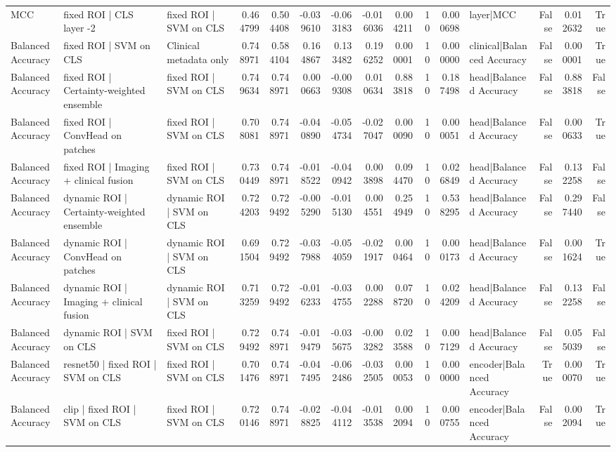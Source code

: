 \begin{table}
\begin{tabular}{lllrrrrrrrrlrrr}
MCC & fixed ROI | CLS layer -2 & fixed ROI | SVM on CLS & 0.464799 & 0.504408 & -0.039610 & -0.063183 & -0.016036 & 0.004211 & 10 & 0.000698 & layer|MCC & False & 0.012632 & True \\
Balanced Accuracy & fixed ROI | SVM on CLS & Clinical metadata only & 0.748971 & 0.584104 & 0.164867 & 0.133482 & 0.196252 & 0.000001 & 10 & 0.000000 & clinical|Balanced Accuracy & False & 0.000001 & True \\
Balanced Accuracy & fixed ROI | Certainty-weighted ensemble & fixed ROI | SVM on CLS & 0.749634 & 0.748971 & 0.000663 & -0.009308 & 0.010634 & 0.883818 & 10 & 0.187498 & head|Balanced Accuracy & False & 0.883818 & False \\
Balanced Accuracy & fixed ROI | ConvHead on patches & fixed ROI | SVM on CLS & 0.708081 & 0.748971 & -0.040890 & -0.054734 & -0.027047 & 0.000090 & 10 & 0.000051 & head|Balanced Accuracy & False & 0.000633 & True \\
Balanced Accuracy & fixed ROI | Imaging + clinical fusion & fixed ROI | SVM on CLS & 0.730449 & 0.748971 & -0.018522 & -0.040942 & 0.003898 & 0.094470 & 10 & 0.026849 & head|Balanced Accuracy & False & 0.132258 & False \\
Balanced Accuracy & dynamic ROI | Certainty-weighted ensemble & dynamic ROI | SVM on CLS & 0.724203 & 0.729492 & -0.005290 & -0.015130 & 0.004551 & 0.254949 & 10 & 0.538295 & head|Balanced Accuracy & False & 0.297440 & False \\
Balanced Accuracy & dynamic ROI | ConvHead on patches & dynamic ROI | SVM on CLS & 0.691504 & 0.729492 & -0.037988 & -0.054059 & -0.021917 & 0.000464 & 10 & 0.000173 & head|Balanced Accuracy & False & 0.001624 & True \\
Balanced Accuracy & dynamic ROI | Imaging + clinical fusion & dynamic ROI | SVM on CLS & 0.713259 & 0.729492 & -0.016233 & -0.034755 & 0.002288 & 0.078720 & 10 & 0.024209 & head|Balanced Accuracy & False & 0.132258 & False \\
Balanced Accuracy & dynamic ROI | SVM on CLS & fixed ROI | SVM on CLS & 0.729492 & 0.748971 & -0.019479 & -0.035675 & -0.003282 & 0.023588 & 10 & 0.007129 & head|Balanced Accuracy & False & 0.055039 & False \\
Balanced Accuracy & resnet50 | fixed ROI | SVM on CLS & fixed ROI | SVM on CLS & 0.701476 & 0.748971 & -0.047495 & -0.062486 & -0.032505 & 0.000053 & 10 & 0.000000 & encoder|Balanced Accuracy & True & 0.000070 & True \\
Balanced Accuracy & clip | fixed ROI | SVM on CLS & fixed ROI | SVM on CLS & 0.720146 & 0.748971 & -0.028825 & -0.044112 & -0.013538 & 0.002094 & 10 & 0.000755 & encoder|Balanced Accuracy & False & 0.002094 & True \\

\end{tabular}
\end{table}

